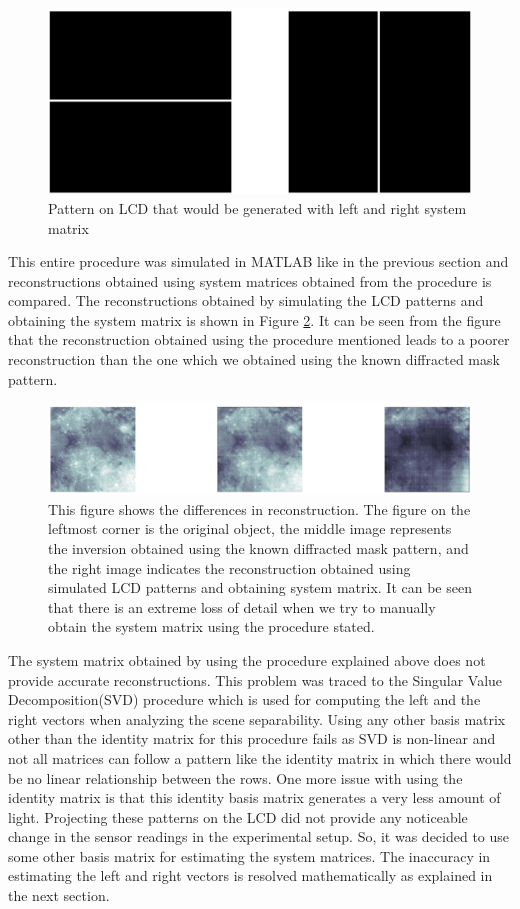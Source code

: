\begin{figure}[h]
\centering
\includegraphics[width = \linewidth]{pics/identity_left_right.png}
\caption{Pattern on LCD that would be generated with left and right system matrix}
\label{fig:pattern_identity}
\end{figure}
This entire procedure was simulated in MATLAB like in the previous section and reconstructions obtained using system matrices obtained from the procedure is compared. The reconstructions obtained by simulating the LCD patterns and obtaining the system matrix is shown in Figure \ref{fig:rec_id}. It can be seen from the figure that the reconstruction obtained using the procedure mentioned leads to a poorer reconstruction than the one which we obtained using the known diffracted mask pattern.
\begin{figure}[h]
\centering
\includegraphics[width = \linewidth]{pics/id_reconst.png}
\caption{This figure shows the differences in reconstruction. The figure on the leftmost corner is the original object, the middle image represents the inversion obtained using the known diffracted mask pattern, and the right image indicates the reconstruction obtained using simulated LCD patterns and obtaining system matrix. It can be seen that there is an extreme loss of detail when we try to manually obtain the system matrix using the procedure stated.}
\label{fig:rec_id}
\end{figure}
The system matrix obtained by using the procedure explained above does not provide accurate reconstructions. This problem was traced to the Singular Value Decomposition(SVD) procedure which is used for computing the left and the right vectors when analyzing the scene separability. Using any other basis matrix other than the identity matrix for this procedure fails as SVD is non-linear and not all matrices can follow a pattern like the identity matrix in which there would be no linear relationship between the rows. One more issue with using the identity matrix is that this identity basis matrix generates a very less amount of light. Projecting these patterns on the LCD did not provide any noticeable change in the sensor readings in the experimental setup. So, it was decided to use some other basis matrix for estimating the system matrices. The inaccuracy in estimating the left and right vectors is resolved mathematically as explained in the next section. 
